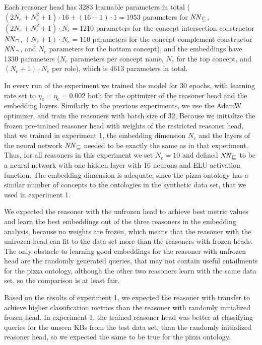 Each reasoner head has 3283 learnable parameters in total ($(2N_e + N_e^2 + 1) \cdot 16 + (16 + 1) \cdot 1 = 1953$ parameters for $\mathit{NN}_\sqsubseteq$, $(2N_e + N_e^2 + 1) \cdot N_e = 1210$ parameters for the concept intersection constructor $\mathit{NN}_\sqcap$, $(N_e + 1) \cdot N_e = 110$ parameters for the concept complement constructor $\mathit{NN}_\lnot$, and $N_e$ parameters for the bottom concept), and the embeddings have 1330 parameters ($N_e$ parameters per concept name, $N_e$ for the top concept, and $(N_e + 1) \cdot N_e$ per role), which is 4613 parameters in total.

In every run of the experiment we trained the model for 30 epochs, with learning rate set to $\eta_c = \eta_e = 0.002$ both for the optimizer of the reasoner head and the embedding layers.
Similarly to the previous experiments, we use the AdamW optimizer, and train the reasoners with batch size of 32. 
Because we initialize the frozen pre-trained reasoner head with weights of the restricted reasoner head, that we trained in experiment 1, the embedding dimension $N_e$ and the layers of the neural network $\mathit{NN}_\sqsubseteq$ needed to be exactly the same as in that experiment.
Thus, for all reasoners in this experiment we set $N_e = 10$ and defined $\mathit{NN}_\sqsubseteq$ to be a neural network with one hidden layer with 16 neurons and ELU activation function.
The embedding dimension is adequate, since the pizza ontology has a similar number of concepts to the ontologies in the synthetic data set, that we used in experiment 1.

We expected the reasoner with the unfrozen head to achieve best metric values and learn the best embeddings out of the three reasoners in the embedding analysis, because no weights are frozen, which means that the reasoner with the unfrozen head can fit to the data set more than the reasoners with frozen heads.
The only obstacle to learning good embeddings for the reasoner with unfrozen head are the randomly generated queries, that may not contain useful entailments for the pizza ontology, although the other two reasoners learn with the same data set, so the comparison is at least fair.

Based on the results of experiment 1, we expected the reasoner with transfer to achieve higher classification metrics than the reasoner with randomly initialized frozen head.
In experiment 1, the trained reasoner head was better at classifying queries for the unseen KBs from the test data set, than the randomly initialized reasoner head, so we expected the same to be true for the pizza ontology.


